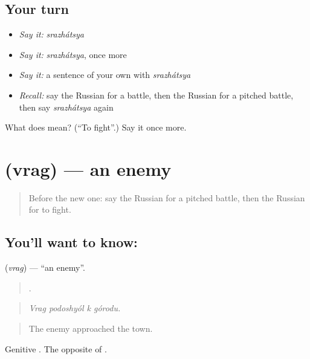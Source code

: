 \subsection*{Your turn}
\begin{itemize}
\raggedright
  \item \emph{Say it:} \emph{srazhátsya}
  \item \emph{Say it:} \emph{srazhátsya}, once more
  \item \emph{Say it:} a sentence of your own with \emph{srazhátsya}
  \item \emph{Recall:} say the Russian for a battle, then the Russian for a pitched battle, then say \emph{srazhátsya} again
\end{itemize}

\begin{tcolorbox}[breakable,colback=teal!4,colframe=teal!35!black,title={Before you move on}]
What does  mean? (\textquotedblleft{}To fight\textquotedblright{}.) Say it once more.
\end{tcolorbox}
\section[\texorpdfstring{\ru{враг} (vrag)}{враг (vrag)}]{ (vrag) — an enemy}

\label{lesson:RU-C323-vrag}



\begin{quote}
Before the new one: say the Russian for a pitched battle, then the Russian for to fight.
\end{quote}

\subsection*{You'll want to know: }
\textbf{} (\emph{vrag}) — \textquotedblleft{}an enemy\textquotedblright{}.

\begin{quote}
   .
\end{quote}

\begin{quote}
\emph{Vrag podoshyól k górodu.}
\end{quote}

\begin{quote}
The enemy approached the town.
\end{quote}

Genitive \emph{}. The opposite of \emph{}.

